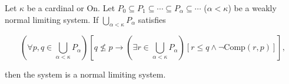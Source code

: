 Let $\kappa$ be a cardinal or $\mathrm{On}$. Let $P_0 \subseteq P_1 \subseteq \cdots \subseteq P_{\alpha} \subseteq \cdots$ ($\alpha < \kappa$) be a weakly normal limiting system. If $\bigcup_{\alpha < \kappa} P_{\alpha}$ satisfies

$$(\forall p, q \in \bigcup_{\alpha < \kappa} P_{\alpha})[q \not\leq p \rightarrow (\exists r \in \bigcup_{\alpha < \kappa} P_{\alpha})[r \leq q \land \neg \mathrm{Comp}(r, p)]],$$

then the system is a normal limiting system.$$
